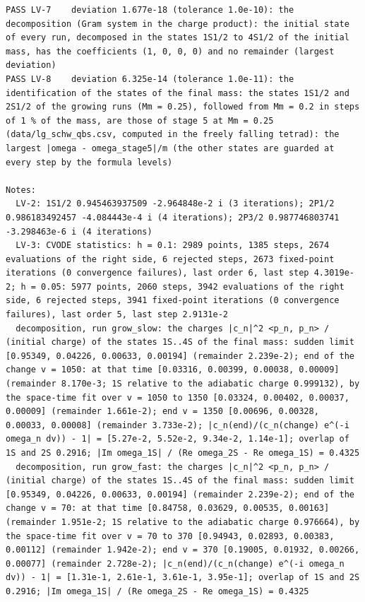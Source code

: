 \documentclass[
  10pt,
]{article}
\begin{document}
\begin{verbatim}
PASS LV-7    deviation 1.677e-18 (tolerance 1.0e-10): the decomposition (Gram system in the charge product): the initial state of every run, decomposed in the states 1S1/2 to 4S1/2 of the initial mass, has the coefficients (1, 0, 0, 0) and no remainder (largest deviation)
PASS LV-8    deviation 6.325e-14 (tolerance 1.0e-11): the identification of the states of the final mass: the states 1S1/2 and 2S1/2 of the growing runs (Mm = 0.25), followed from Mm = 0.2 in steps of 1 % of the mass, are those of stage 5 at Mm = 0.25 (data/lg_schw_qbs.csv, computed in the freely falling tetrad): the largest |omega - omega_stage5|/m (the other states are guarded at every step by the formula levels)

Notes:
  LV-2: 1S1/2 0.945463937509 -2.964848e-2 i (3 iterations); 2P1/2 0.986183492457 -4.084443e-4 i (4 iterations); 2P3/2 0.987746803741 -3.298463e-6 i (4 iterations)
  LV-3: CVODE statistics: h = 0.1: 2989 points, 1385 steps, 2674 evaluations of the right side, 6 rejected steps, 2673 fixed-point iterations (0 convergence failures), last order 6, last step 4.3019e-2; h = 0.05: 5977 points, 2060 steps, 3942 evaluations of the right side, 6 rejected steps, 3941 fixed-point iterations (0 convergence failures), last order 5, last step 2.9131e-2
  decomposition, run grow_slow: the charges |c_n|^2 <p_n, p_n> / (initial charge) of the states 1S..4S of the final mass: sudden limit [0.95349, 0.04226, 0.00633, 0.00194] (remainder 2.239e-2); end of the change v = 1050: at that time [0.03316, 0.00399, 0.00038, 0.00009] (remainder 8.170e-3; 1S relative to the adiabatic charge 0.999132), by the space-time fit over v = 1050 to 1350 [0.03324, 0.00402, 0.00037, 0.00009] (remainder 1.661e-2); end v = 1350 [0.00696, 0.00328, 0.00033, 0.00008] (remainder 3.733e-2); |c_n(end)/(c_n(change) e^(-i omega_n dv)) - 1| = [5.27e-2, 5.52e-2, 9.34e-2, 1.14e-1]; overlap of 1S and 2S 0.2916; |Im omega_1S| / (Re omega_2S - Re omega_1S) = 0.4325
  decomposition, run grow_fast: the charges |c_n|^2 <p_n, p_n> / (initial charge) of the states 1S..4S of the final mass: sudden limit [0.95349, 0.04226, 0.00633, 0.00194] (remainder 2.239e-2); end of the change v = 70: at that time [0.84758, 0.03629, 0.00535, 0.00163] (remainder 1.951e-2; 1S relative to the adiabatic charge 0.976664), by the space-time fit over v = 70 to 370 [0.94943, 0.02893, 0.00383, 0.00112] (remainder 1.942e-2); end v = 370 [0.19005, 0.01932, 0.00266, 0.00077] (remainder 2.728e-2); |c_n(end)/(c_n(change) e^(-i omega_n dv)) - 1| = [1.31e-1, 2.61e-1, 3.61e-1, 3.95e-1]; overlap of 1S and 2S 0.2916; |Im omega_1S| / (Re omega_2S - Re omega_1S) = 0.4325

\end{verbatim}
\end{document}
